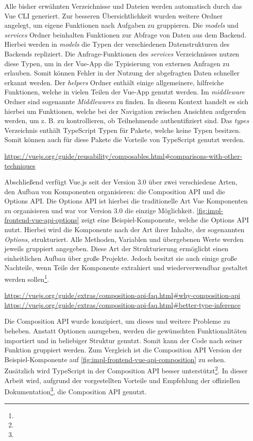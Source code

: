 Alle bisher erwähnten Verzeichnisse und Dateien werden automatisch durch das Vue
CLI generiert. Zur besseren Übersichtlichkeit wurden weitere Ordner angelegt, um
eigene Funktionen nach Aufgaben zu gruppieren. Die \textit{models} und
\textit{services} Ordner beinhalten Funktionen zur Abfrage von Daten aus dem
Backend. Hierbei werden in \textit{models} die Typen der verschiedenen
Datenstrukturen des Backends repliziert. Die Anfrage-Funktionen des
\textit{services} Verzeichnisses nutzen diese Typen, um in der Vue-App die
Typisierung von externen Anfragen zu erlauben. Somit können Fehler in der
Nutzung der abgefragten Daten schneller erkannt werden. Der \textit{helpers}
Ordner enthält einige allgemeinere, hilfreiche Funktionen, welche in vielen
Teilen der Vue-App genutzt werden. Im \textit{middleware} Ordner sind sogenannte
\textit{Middlewares} zu finden. In diesem Kontext handelt es sich hierbei um
Funktionen, welche bei der Navigation zwischen Ansichten aufgerufen werden, um
z. B. zu kontrollieren, ob Teilnehmende authentifiziert sind. Das \textit{types}
Verzeichnis enthält TypeScript Typen für Pakete, welche keine Typen besitzen.
Somit können auch für diese Pakete die Vorteile von TypeScript genutzt werden.


\urldef\vuemixin\url{https://vuejs.org/guide/reusability/composables.html#comparisons-with-other-techniques}

Abschließend verfügt Vue.js seit der Version 3.0 über zwei verschiedene Arten,
den Aufbau von Komponenten organisieren: die Composition API und die Options
API. Die Options API ist hierbei die traditionelle Art Vue Komponenten zu
organisieren und war vor Version 3.0 die einzige Möglichkeit.
\autoref{fig:impl-frontend-vue-api-options} zeigt eine Beispiel-Komponente,
welche die Options API nutzt. Hierbei wird die Komponente nach der Art ihrer
Inhalte, der sogenannten \textit{Options}, strukturiert. Alle Methoden, Variablen und
übergebenen Werte werden jeweils gruppiert angegeben. Diese Art der
Strukturierung ermöglicht einen einheitlichen Aufbau über große Projekte. Jedoch
besitzt sie auch einige große Nachteile, wenn Teile der Komponente extrahiert
und wiederverwendbar gestaltet werden sollen\footnote{\vuemixin}.

\urldef\vuecomp\url{https://vuejs.org/guide/extras/composition-api-faq.html#why-composition-api}
\urldef\vuets\url{https://vuejs.org/guide/extras/composition-api-faq.html#better-type-inference}

Die Composition API wurde konzipiert, um dieses und weitere Probleme zu beheben.
Anstatt Optionen anzugeben, werden die gewünschten Funktionalitäten importiert
und in beliebiger Struktur genutzt. Somit kann der Code nach seiner Funktion
gruppiert werden. Zum Vergleich ist die Composition API Version der
Beispiel-Komponente auf \autoref{fig:impl-frontend-vue-api-composition} zu
sehen. Zusätzlich wird TypeScript in der Composition API besser
unterstützt\footnote{\vuets}. In dieser Arbeit wird, aufgrund der vorgestellten
Vorteile und Empfehlung der offiziellen Dokumentation\footnote{\vuecomp}, die
Composition API genutzt.

